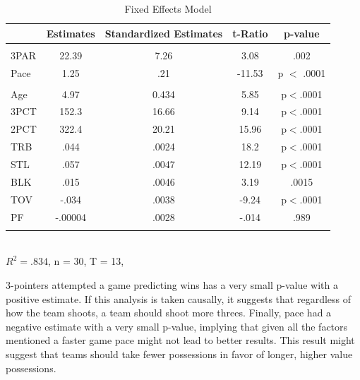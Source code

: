 \documentclass[12pt]{article}
\begin{document}
\begin{table}[ht]
\def\tablename{Table}
\caption{Fixed Effects Model}
\centering
\begin{tabular}{lcccc}
\\
\hline \hline
& Estimates  &  Standardized Estimates  &  t-Ratio  &  p-value  \\
          
\hline

\\

3PAR  & 22.39  &       7.26 &                3.08 & .002            \\
Pace & 1.25 & .21 & -11.53 & p $<$ .0001\\
\\
Age & 4.97 & 0.434& 5.85 & p$<$.0001 \\
3PCT & 152.3 & 16.66 & 9.14 & p$<$.0001 \\
2PCT & 322.4 & 20.21 & 15.96 & p$<$.0001\\
TRB & .044 & .0024 & 18.2 & p$<$.0001\\
STL & .057 & .0047 & 12.19 & p$<$.0001\\
BLK & .015 & .0046 & 3.19& .0015\\
TOV& -.034 & .0038 & -9.24 & p$<$.0001\\
PF & -.00004 & .0028 & -.014 & .989\\

\\

\end{tabular}
\\ 
\scriptsize{$R^2 = .834$,  n = 30, T = 13,}\\

\end{table}


        	3-pointers attempted a game predicting wins has a very small p-value with a positive estimate. If this analysis is taken causally, it suggests that regardless of how the team shoots, a team should shoot more threes. Finally, pace had a negative estimate with a very small p-value, implying that given all the factors mentioned a faster game pace might not lead to better results. This result might suggest that teams should take fewer possessions in favor of longer, higher value possessions. \par
 
\end{document}
